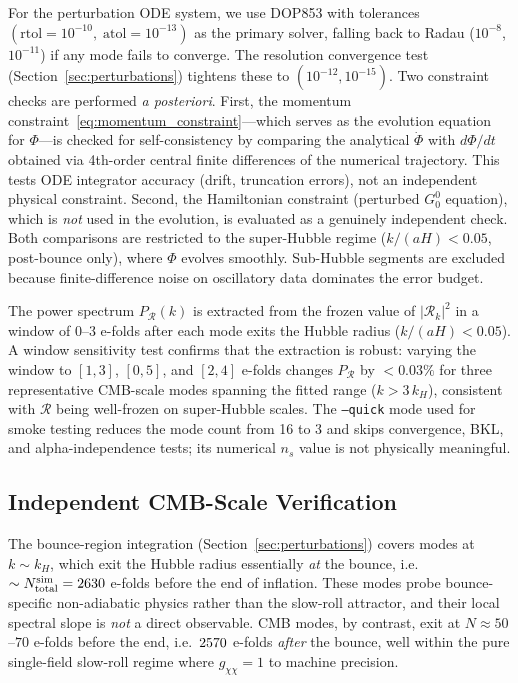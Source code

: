 \documentclass[11pt,a4paper]{article}
\begin{document}
For the perturbation ODE system, we use DOP853 with tolerances $(\text{rtol}=10^{-10},\;\text{atol}=10^{-13})$ as the primary solver, falling back to Radau ($10^{-8}$, $10^{-11}$) if any mode fails to converge. The resolution convergence test (Section~\ref{sec:perturbations}) tightens these to $(10^{-12}, 10^{-15})$. Two constraint checks are performed \emph{a posteriori}. First, the momentum constraint~\eqref{eq:momentum_constraint}---which serves as the evolution equation for $\Phi$---is checked for self-consistency by comparing the analytical $\dot\Phi$ with $d\Phi/dt$ obtained via 4th-order central finite differences of the numerical trajectory. This tests ODE integrator accuracy (drift, truncation errors), not an independent physical constraint. Second, the Hamiltonian constraint (perturbed $G^0_0$ equation), which is \emph{not} used in the evolution, is evaluated as a genuinely independent check. Both comparisons are restricted to the super-Hubble regime ($k/(aH) < 0.05$, post-bounce only), where $\Phi$ evolves smoothly. Sub-Hubble segments are excluded because finite-difference noise on oscillatory data dominates the error budget.

The power spectrum $P_\mathcal{R}(k)$ is extracted from the frozen value of $|\mathcal{R}_k|^2$ in a window of 0--3 e-folds after each mode exits the Hubble radius ($k/(aH) < 0.05$). A window sensitivity test confirms that the extraction is robust: varying the window to $[1,3]$, $[0,5]$, and $[2,4]$ e-folds changes $P_\mathcal{R}$ by $< 0.03\%$ for three representative CMB-scale modes spanning the fitted range ($k > 3\,k_H$), consistent with $\mathcal{R}$ being well-frozen on super-Hubble scales. The \texttt{--quick} mode used for smoke testing reduces the mode count from 16 to 3 and skips convergence, BKL, and alpha-independence tests; its numerical $n_s$ value is not physically meaningful.

\subsection{Independent CMB-Scale Verification}
\label{sec:cmb_verification}

The bounce-region integration (Section~\ref{sec:perturbations}) covers modes at $k \sim k_H$, which exit the Hubble radius essentially \emph{at} the bounce, i.e.~$\sim N_{\rm total}^{\rm sim} = 2630$ e-folds before the end of inflation. These modes probe bounce-specific non-adiabatic physics rather than the slow-roll attractor, and their local spectral slope is \emph{not} a direct observable. CMB modes, by contrast, exit at $N \approx 50$--$70$ e-folds before the end, i.e.~$2570$ e-folds \emph{after} the bounce, well within the pure single-field slow-roll regime where $g_{\chi\chi} = 1$ to machine precision.
\end{document}
